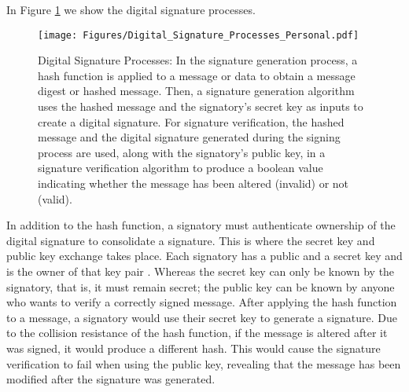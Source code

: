 \documentclass[nofootinbib,aps,prd,reprint,superscriptaddress,floatfix]{revtex4-2}
\begin{document}
In Figure \ref{fig:Digital_Signature} we show the digital signature processes.

\begin{figure}[hbtp]
    \centering
    \texttt{[image: Figures/Digital\_Signature\_Processes\_Personal.pdf]}
    \caption{Digital Signature Processes: In the signature generation process, a hash function is applied to a message or data to obtain a message digest or hashed message. Then, a signature generation algorithm uses the hashed message and the signatory's secret key as inputs to create a digital signature. For signature verification, the hashed message and the digital signature generated during the signing process are used, along with the signatory's public key, in a signature verification algorithm to produce a boolean value indicating whether the message has been altered (invalid) or not (valid).}
    \label{fig:Digital_Signature}
\end{figure}

In addition to the hash function, a signatory must authenticate ownership of the digital signature to consolidate a signature. This is where the secret key and public key exchange takes place. Each signatory has a public and a secret key and is the owner of that key pair \cite{Asymmetric_cryptography}. Whereas the secret key can only be known by the signatory, that is, it must remain secret; the public key can be known by anyone who wants to verify a correctly signed message. After applying the hash function to a message, a signatory would use their secret key to generate a signature. Due to the collision resistance of the hash function, if the message is altered after it was signed, it would produce a different hash. This would cause the signature verification to fail when using the public key, revealing that the message has been modified after the signature was generated.
 
\end{document}
